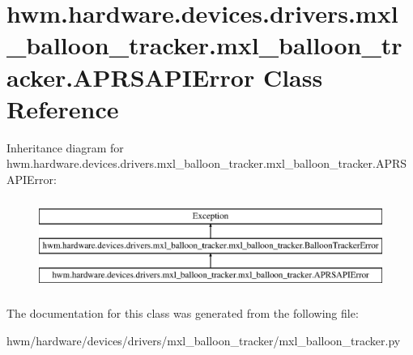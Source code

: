 \hypertarget{classhwm_1_1hardware_1_1devices_1_1drivers_1_1mxl__balloon__tracker_1_1mxl__balloon__tracker_1_1_a_p_r_s_a_p_i_error}{\section{hwm.\-hardware.\-devices.\-drivers.\-mxl\-\_\-balloon\-\_\-tracker.\-mxl\-\_\-balloon\-\_\-tracker.\-A\-P\-R\-S\-A\-P\-I\-Error Class Reference}
\label{classhwm_1_1hardware_1_1devices_1_1drivers_1_1mxl__balloon__tracker_1_1mxl__balloon__tracker_1_1_a_p_r_s_a_p_i_error}
}
Inheritance diagram for hwm.\-hardware.\-devices.\-drivers.\-mxl\-\_\-balloon\-\_\-tracker.\-mxl\-\_\-balloon\-\_\-tracker.\-A\-P\-R\-S\-A\-P\-I\-Error\-:\begin{figure}[H]
\begin{center}
\leavevmode
\includegraphics[height=3.000000cm]{classhwm_1_1hardware_1_1devices_1_1drivers_1_1mxl__balloon__tracker_1_1mxl__balloon__tracker_1_1_a_p_r_s_a_p_i_error}
\end{center}
\end{figure}


The documentation for this class was generated from the following file\-:\begin{DoxyCompactItemize}
\item 
hwm/hardware/devices/drivers/mxl\-\_\-balloon\-\_\-tracker/mxl\-\_\-balloon\-\_\-tracker.\-py\end{DoxyCompactItemize}

